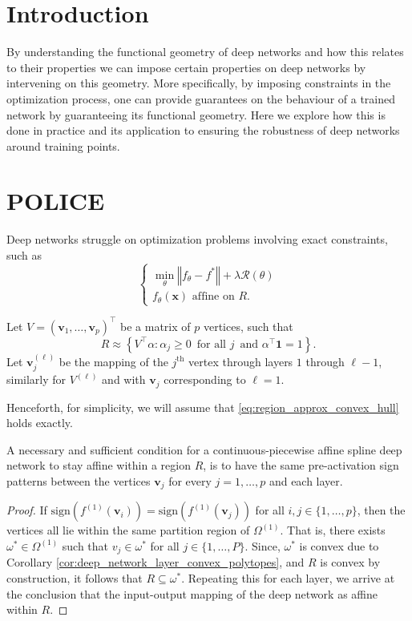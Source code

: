 \section{Introduction}

By understanding the functional geometry of deep networks and how this relates to their properties we can impose certain properties on deep networks by intervening on this geometry. More specifically, by imposing constraints in the optimization process, one can provide guarantees on the behaviour of a trained network by guaranteeing its functional geometry. Here we explore how this is done in practice and its application to ensuring the robustness of deep networks around training points.

\section{POLICE}\label{sec:police}

Deep networks struggle on optimization problems involving exact constraints, such as $$\begin{cases}\min_{\theta}\left\Vert f_{\theta}-f^*\right\Vert+\lambda\mathcal{R}(\theta)\\f_{\theta}(\mathbf{x})\text{ affine on }R.\end{cases}$$

Let $V=\left(\mathbf{v}_1,\dots,\mathbf{v}_p\right)^\top$ be a matrix of $p$ vertices, such that 
\begin{equation}\label{eq:region_approx_convex_hull}
    R\approx\left\{V^\top\alpha:\alpha_j\geq0\,\text{ for all }j\,\text{ and }\alpha^\top\mathbf{1}=1\right\}.
\end{equation}
Let $\mathbf{v}_j^{(\ell)}$ be the mapping of the $j^{\text{th}}$ vertex through layers $1$ through $\ell-1$, similarly for $V^{(\ell)}$ and with $\mathbf{v}_j$ corresponding to $\ell=1$.

Henceforth, for simplicity, we will assume that \eqref{eq:region_approx_convex_hull} holds exactly.

\begin{theorem}\label{thm:nec_suf_to_stay_affine}
    A necessary and sufficient condition for a continuous-piecewise affine spline deep network to stay affine within a region $R$, is to have the same pre-activation sign patterns between the vertices $\mathbf{v}_j$ for every $j=1,\dots,p$ and each layer.
\end{theorem}

\begin{proof}
    If $\mathrm{sign}\left(f^{(1)}(\mathbf{v}_i)\right)=\mathrm{sign}\left(f^{(1)}(\mathbf{v}_j)\right)$ for all $i,j\in\{1,\dots,p\}$, then the vertices all lie within the same partition region of $\Omega^{(1)}$. That is, there exists $\omega^*\in\Omega^{(1)}$ such that $v_j\in\omega^*$ for all $j\in\{1,\dots,P\}$. Since, $\omega^*$ is convex due to  Corollary \ref{cor:deep_network_layer_convex_polytopes}, and $R$ is convex by construction, it follows that $R\subseteq\omega^*$. Repeating this for each layer, we arrive at the conclusion that the input-output mapping of the deep network as affine within $R$.
\end{proof}

